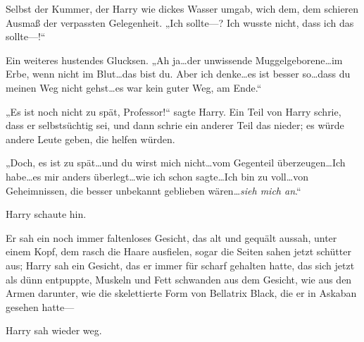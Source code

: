 Selbst der Kummer, der Harry wie dickes Wasser umgab, wich dem, dem schieren Ausmaß der verpassten Gelegenheit.
„Ich sollte—? Ich wusste nicht, dass ich das sollte—!“

Ein weiteres hustendes Glucksen.
„Ah ja…der unwissende Muggelgeborene…im Erbe, wenn nicht im Blut…das bist du. Aber ich denke…es ist besser so…dass du meinen Weg nicht gehst…es war kein guter Weg, am Ende.“

„Es ist noch nicht zu spät, Professor!“ sagte Harry.
Ein Teil von Harry schrie, dass er selbstsüchtig sei, und dann schrie ein anderer Teil das nieder; es würde andere Leute geben, die helfen würden.

„Doch, es ist zu spät…und du wirst mich nicht…vom Gegenteil überzeugen…Ich habe…es mir anders überlegt…wie ich schon sagte…Ich bin zu voll…von Geheimnissen, die besser unbekannt geblieben wären…\emph{sieh mich an}.“

Harry schaute hin.

Er sah ein noch immer faltenloses Gesicht, das alt und gequält aussah, unter einem Kopf, dem rasch die Haare ausfielen, sogar die Seiten sahen jetzt schütter aus; Harry sah ein Gesicht, das er immer für scharf gehalten hatte, das sich jetzt als dünn entpuppte, Muskeln und Fett schwanden aus dem Gesicht, wie aus den Armen darunter, wie die skelettierte Form von Bellatrix Black, die er in Askaban gesehen hatte—

Harry sah wieder weg.

